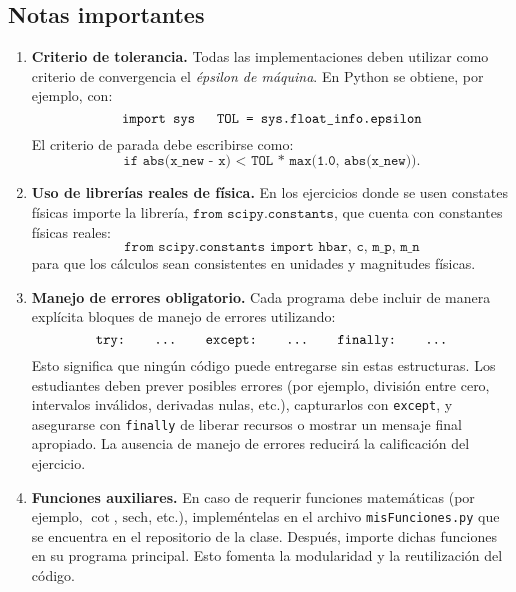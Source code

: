 \documentclass[12pt]{article}
\begin{document}
\subsection*{Notas importantes}

\begin{enumerate}
  \item \textbf{Criterio de tolerancia.}  
  Todas las implementaciones deben utilizar como criterio de convergencia el \emph{épsilon de máquina}.  
  En Python se obtiene, por ejemplo, con:
  \[
    \texttt{import sys \quad TOL = sys.float\_info.epsilon}
  \]
  El criterio de parada debe escribirse como:  
  \[
    \texttt{if abs(x\_new - x) < TOL * max(1.0, abs(x\_new))}.
  \]

  \item \textbf{Uso de librerías reales de física.}  
  En los ejercicios donde se usen constates físicas importe la librería, $\texttt{from scipy.constants}$, que cuenta con constantes físicas reales:
  \[
    \texttt{from scipy.constants import hbar, c, m\_p, m\_n}
  \]
  para que los cálculos sean consistentes en unidades y magnitudes físicas.

  \item \textbf{Manejo de errores obligatorio.}  
  Cada programa debe incluir de manera explícita bloques de manejo de errores utilizando:
  \[
    \texttt{try: \quad ... \quad except: \quad ... \quad finally: \quad ...}
  \]
  Esto significa que ningún código puede entregarse sin estas estructuras.  
  Los estudiantes deben prever posibles errores (por ejemplo, división entre cero, intervalos inválidos, derivadas nulas, etc.), capturarlos con \texttt{except}, y asegurarse con \texttt{finally} de liberar recursos o mostrar un mensaje final apropiado.  
  La ausencia de manejo de errores reducirá la calificación del ejercicio.

  \item \textbf{Funciones auxiliares.}  
  En caso de requerir funciones matemáticas (por ejemplo, \(\cot\), \(\mathrm{sech}\), etc.), impleméntelas en el archivo \texttt{misFunciones.py} que se encuentra en el repositorio de la clase.  
  Después, importe dichas funciones en su programa principal. Esto fomenta la modularidad y la reutilización del código.

\end{enumerate}
\end{document}
